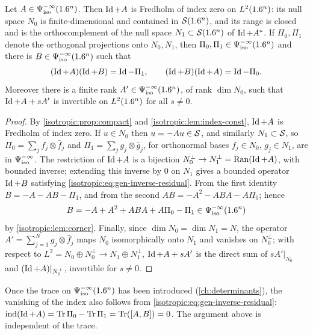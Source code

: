 \begin{proposition}\label{isotropic:prop:Id+A}
Let $A\in\Psi^{-\infty}_{\mathrm{iso}}(1.6^n)$. Then $\operatorname{Id}+A$ is Fredholm of index zero on
$L^2(1.6^n)$: its null space $N_0$ is finite-dimensional and contained in
$\mathcal{S}(1.6^n)$, and its range is closed and is the orthocomplement of the null
space $N_1\subset\mathcal{S}(1.6^n)$ of $\operatorname{Id}+A^*$. If $\Pi_0,\Pi_1$ denote the orthogonal
projections onto $N_0,N_1$, then $\Pi_0,\Pi_1\in\Psi^{-\infty}_{\mathrm{iso}}(1.6^n)$ and there
is $B\in\Psi^{-\infty}_{\mathrm{iso}}(1.6^n)$ such that
\begin{equation}\label{isotropic:eq:gen-inverse-residual}
  (\operatorname{Id}+A)(\operatorname{Id}+B)=\operatorname{Id}-\Pi_1,\qquad(\operatorname{Id}+B)(\operatorname{Id}+A)=\operatorname{Id}-\Pi_0 .
\end{equation}
Moreover there is a finite rank $A'\in\Psi^{-\infty}_{\mathrm{iso}}(1.6^n)$, of rank
$\dim N_0$, such that $\operatorname{Id}+A+sA'$ is invertible on $L^2(1.6^n)$ for all $s\ne0$.
\end{proposition}
\begin{proof}
By \cref{isotropic:prop:compact} and \cref{isotropic:lem:index-const}, $\operatorname{Id}+A$
is Fredholm of index zero. If $u\in N_0$ then $u=-Au\in\mathcal{S}$, and similarly
$N_1\subset\mathcal{S}$, so $\Pi_0=\sum_jf_j\otimes\bar f_j$ and $\Pi_1=\sum_jg_j\otimes\bar g_j$,
for orthonormal bases $f_j\in N_0$, $g_j\in N_1$, are in $\Psi^{-\infty}_{\mathrm{iso}}$. The
restriction of $\operatorname{Id}+A$ is a bijection $N_0^\perp\to N_1^\perp=\operatorname{Ran}(\operatorname{Id}+A)$,
with bounded inverse; extending this inverse by $0$ on $N_1$ gives a bounded
operator $\operatorname{Id}+B$ satisfying \eqref{isotropic:eq:gen-inverse-residual}. From the
first identity $B=-A-AB-\Pi_1$, and from the second
$AB=-A^2-ABA-A\Pi_0$; hence
\begin{equation*}
  B=-A+A^2+ABA+A\Pi_0-\Pi_1\in\Psi^{-\infty}_{\mathrm{iso}}(1.6^n)
\end{equation*}
by \cref{isotropic:lem:corner}. Finally, since $\dim N_0=\dim N_1=N$, the operator
$A'=\sum_{j=1}^Ng_j\otimes\bar f_j$ maps $N_0$ isomorphically onto $N_1$ and
vanishes on $N_0^\perp$; with respect to $L^2=N_0\oplus N_0^\perp\to N_1\oplus N_1^\perp$,
$\operatorname{Id}+A+sA'$ is the direct sum of $sA'|_{N_0}$ and $(\operatorname{Id}+A)|_{N_0^\perp}$, invertible
for $s\ne0$.
\end{proof}

\begin{remark}\label{isotropic:rem:index-trace}
Once the trace on $\Psi^{-\infty}_{\mathrm{iso}}(1.6^n)$ has been introduced
(\cref{ch:determinants}), the vanishing of the index also follows from
\eqref{isotropic:eq:gen-inverse-residual}:
$\operatorname{ind}(\operatorname{Id}+A)=\operatorname{Tr}\Pi_0-\operatorname{Tr}\Pi_1=\operatorname{Tr}([A,B])=0$. The argument above is
independent of the trace.
\end{remark}

